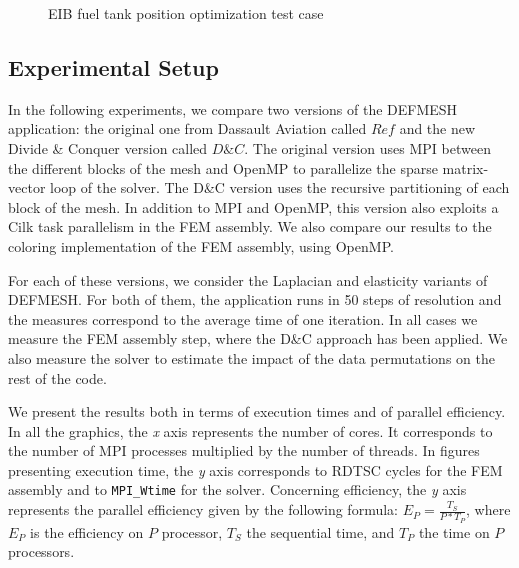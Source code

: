 \documentclass{IOS-Book-Article}
\begin{document}
\begin{figure}[htp]
 \caption{EIB fuel tank position optimization test case}
 \label{fig:reservoir}
\end{figure}

\subsection{Experimental Setup}
In the following experiments, we compare two versions of the DEFMESH application: the original one from Dassault Aviation called $Ref$ and the new Divide \& Conquer version called $D\&C$.
The original version uses MPI between the different blocks of the mesh and OpenMP to parallelize the sparse matrix-vector loop of the solver.
The D\&C version uses the recursive partitioning of each block of the mesh.
In addition to MPI and OpenMP, this version also exploits a Cilk task parallelism in the FEM assembly.
We also compare our results to the coloring implementation of the FEM assembly, using OpenMP.

For each of these versions, we consider the Laplacian and elasticity variants of DEFMESH.
For both of them, the application runs in 50 steps of resolution and the measures correspond to the average time of one iteration.
In all cases we measure the FEM assembly step, where the D\&C approach has been applied.
We also measure the solver to estimate the impact of the data permutations on the rest of the code.

We present the results both in terms of execution times and of parallel efficiency.
In all the graphics, the \emph{x} axis represents the number of cores. It corresponds to the number of MPI processes multiplied by the number of threads.
In figures presenting execution time, the \emph{y} axis corresponds to RDTSC cycles for the FEM assembly and to \texttt{MPI\_Wtime} for the solver.
Concerning efficiency, the \emph{y} axis represents the parallel efficiency given by the following formula:
$E_{P} = \frac{T_{S}}{P*T_{P}}$, where $E_{P}$ is the efficiency on $P$ processor, $T_{S}$ the sequential time, and $T_{P}$ the time on $P$ processors.
\end{document}
